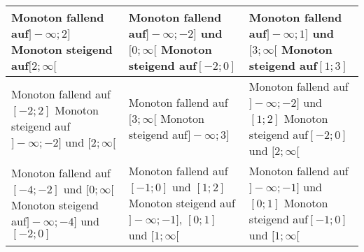 \begin{Answer}[ref=monotonieA1]\\
	\begin{tabular}{p{}|p{}|p{}}
		\hline
		Monoton fallend auf\newline \(]-\infty;2]\)\newline
		Monoton steigend auf\newline \([2;\infty[\)
		&
		Monoton fallend auf\newline \(]-\infty;-2]\) und \([0;\infty[\)\newline
		Monoton steigend auf\newline \([-2;0]\)
		&
		Monoton fallend auf\newline \(]-\infty;1]\) und \([3;\infty[\)\newline
		Monoton steigend auf\newline \([1;3]\)
		\\
		\hline
		Monoton fallend auf\newline \([-2;2]\)\newline
		Monoton steigend auf\newline \(]-\infty;-2]\) und \([2;\infty[\)
		&
		Monoton fallend auf\newline \([3;\infty[\)\newline
		Monoton steigend auf\newline \(]-\infty;3]\)
		&
		Monoton fallend auf\newline \(]-\infty;-2]\) und \([1;2]\)\newline
		Monoton steigend auf\newline \([-2;0]\) und \([2;\infty[\)
		\\
		\hline
		Monoton fallend auf\newline \([-4;-2]\) und \([0;\infty[\)\newline
		Monoton steigend auf\newline \(]-\infty;-4]\) und \([-2;0]\)
		&
		Monoton fallend auf\newline \([-1;0]\) und \([1;2]\)\newline
		Monoton steigend auf\newline \(]-\infty;-1]\), \([0;1]\) und \([1;\infty[\)
		&
		Monoton fallend auf\newline \(]-\infty;-1]\) und \([0;1]\)\newline
		Monoton steigend auf\newline \([-1;0]\) und \([1;\infty[\)
		\\
		\hline
	\end{tabular}
\end{Answer}